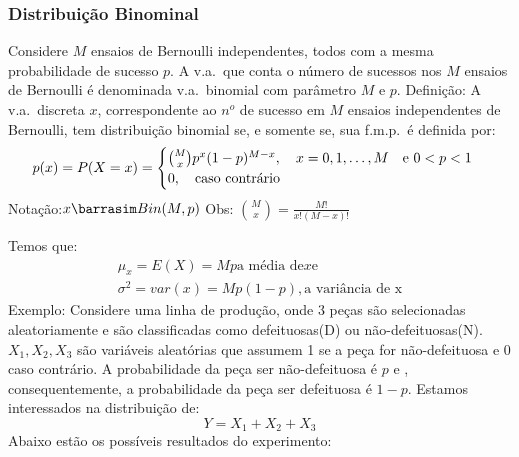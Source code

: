 \documentclass[11pt,a4paper]{article}
\begin{document}
\subsubsection{Distribuição Binominal}
Considere $M$ ensaios de Bernoulli independentes, todos com a mesma probabilidade
de sucesso $p$. A v.a.\ que conta o número de sucessos nos $M$ ensaios de Bernoulli
é denominada v.a.\ binomial com parâmetro $M$ e $p$.
Definição: A v.a.\ discreta $x$, correspondente ao $n^o$ de sucesso em $M$ ensaios
independentes de Bernoulli, tem distribuição binomial se, e somente se, sua 
f.m.p.\ é definida por: 
\begin{align}
  p(x)=P(X=x)=\begin{cases}
    \binom{M}{x}p^x (1-p)^{M-x}, \text{\quad}x=0,1,\dots,M \text{\quad e }0<p<1\\
    0, \text{\quad caso contrário}
  \end{cases}
\end{align}
Notação:$ x \barrasim Bin(M,p)\\$
Obs: $\binom{M}{x}=\frac{M!}{x!(M-x)!}$

Temos que: 
\begin{align}
  \mu_{x}=E(X)=Mp\text{a média de} x \text{e}\\
  \sigma^2 =var(x)=Mp(1-p), \text{a variância de x}
\end{align}
Exemplo: Considere uma linha de produção, onde 3 peças são selecionadas aleatoriamente
e são classificadas como defeituosas(D) ou não-defeituosas(N). $X_{1},X_{2},X_{3}$
são variáveis aleatórias que assumem 1 se a peça for não-defeituosa e 0 caso 
contrário. A probabilidade da peça ser não-defeituosa é $p$ e , consequentemente, 
a probabilidade da peça ser defeituosa é $1-p$. Estamos interessados na distribuição
de:
$$Y=X_{1}+X_{2}+X_{3}$$
Abaixo estão os possíveis resultados do experimento:
\end{document}
